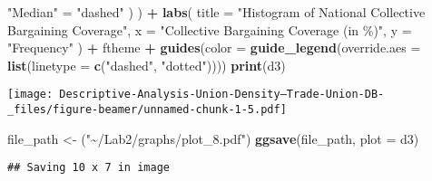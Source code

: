 \documentclass[
  ignorenonframetext,
]{beamer}
\newenvironment{Shaded}{\begin{snugshade}}{\end{snugshade}}
\newcommand{\AttributeTok}[1]{\textcolor[rgb]{0.13,0.29,0.53}{#1}}
\newcommand{\FunctionTok}[1]{\textcolor[rgb]{0.13,0.29,0.53}{\textbf{#1}}}
\newcommand{\NormalTok}[1]{#1}
\newcommand{\OtherTok}[1]{\textcolor[rgb]{0.56,0.35,0.01}{#1}}
\newcommand{\SpecialCharTok}[1]{\textcolor[rgb]{0.81,0.36,0.00}{\textbf{#1}}}
\newcommand{\StringTok}[1]{\textcolor[rgb]{0.31,0.60,0.02}{#1}}
\begin{document}
\begin{frame}[fragile]
\begin{Shaded}
\begin{Highlighting}[]
      \StringTok{"Median"} \OtherTok{=} \StringTok{"dashed"}
\NormalTok{    )}
\NormalTok{  ) }\SpecialCharTok{+}
  \FunctionTok{labs}\NormalTok{(}
    \AttributeTok{title =} \StringTok{"Histogram of National Collective Bargaining Coverage"}\NormalTok{,}
    \AttributeTok{x =} \StringTok{"Collective Bargaining Coverage (in \%)"}\NormalTok{,}
    \AttributeTok{y =} \StringTok{"Frequency"}
\NormalTok{  ) }\SpecialCharTok{+}
\NormalTok{  ftheme }\SpecialCharTok{+}
  \FunctionTok{guides}\NormalTok{(}\AttributeTok{color =} \FunctionTok{guide\_legend}\NormalTok{(}\AttributeTok{override.aes =} \FunctionTok{list}\NormalTok{(}\AttributeTok{linetype =} \FunctionTok{c}\NormalTok{(}\StringTok{"dashed"}\NormalTok{, }\StringTok{"dotted"}\NormalTok{))))}
\FunctionTok{print}\NormalTok{(d3)}
\end{Highlighting}
\end{Shaded}

\texttt{[image: Descriptive-Analysis-Union-Density--Trade-Union-DB-\_files/figure-beamer/unnamed-chunk-1-5.pdf]}

\begin{Shaded}
\begin{Highlighting}[]
\NormalTok{file\_path }\OtherTok{\textless{}{-}}\NormalTok{ (}\StringTok{"\textasciitilde{}/Lab2/graphs/plot\_8.pdf"}\NormalTok{)}
\FunctionTok{ggsave}\NormalTok{(file\_path, }\AttributeTok{plot =}\NormalTok{ d3)}
\end{Highlighting}
\end{Shaded}

\begin{verbatim}
## Saving 10 x 7 in image
\end{verbatim}


\end{frame}
\end{document}
